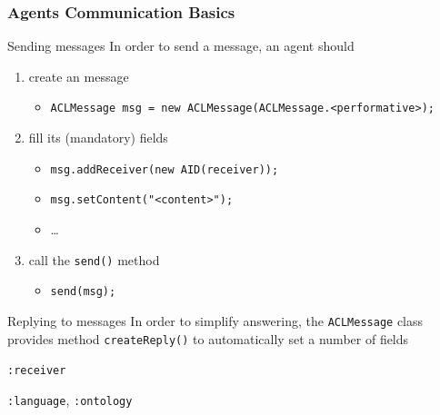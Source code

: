 \documentclass{beamer}\mode<presentation>{\usetheme{AMSCesenaPurpleAndGold}}
\begin{document}
\begin{frame}[c,allowframebreaks]\frametitle{Agents Communication Basics}
    \begin{block}{Sending messages}
        In order to send a message, an agent should
        \begin{enumerate}
            \item create an \acl{} message
            \begin{itemize}
                \item \footnotesize\texttt{ACLMessage msg = new ACLMessage(ACLMessage.<performative>);}
            \end{itemize}
            \item fill its (mandatory) fields
            \begin{itemize}
                \item \footnotesize\texttt{msg.addReceiver(new AID(receiver));}
                \item \footnotesize\texttt{msg.setContent("<content>");}
                \item \ldots
            \end{itemize}
            \item call the \texttt{send()} method
            \begin{itemize}
                \item \footnotesize\texttt{send(msg);}
            \end{itemize}
        \end{enumerate}
    \end{block}
    \begin{block}{Replying to messages}
        In order to simplify answering, the \texttt{ACLMessage} class provides method \texttt{createReply()} to automatically set a number of \acl{} fields
        \begin{itemize}\begin{small}
                \item \texttt{:receiver}
                \item \texttt{:language}, \texttt{:ontology}

\end{small}
\end{itemize}
\end{block}
\end{frame}
\end{document}
